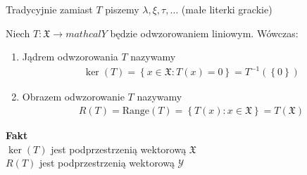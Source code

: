 Tradycyjnie zamiast $ T $ piszemy $ \lambda,\xi,\tau,\dots  $ (małe literki grackie)
\begin{defi}
Niech $ T:\mathfrak X\to mathcal Y $ będzie odwzorowaniem liniowym. Wówczas:
\begin{enumerate}
\item Jądrem odwzorowania $ T $ nazywamy
\begin{gather*}
\ker(T)=\left\{x\in\mathfrak X:T(x)=0\right\}=T^{-1}(\left\{0\right\})
\end{gather*}
\item Obrazem odwzorowanie $ T $ nazywamy
\begin{gather*}
R(T)=\text{Range}(T)=\left\{T(x):x\in\mathfrak X\right\}=T(\mathfrak X)
\end{gather*}
\end{enumerate}
\end{defi}
\textbf{Fakt}\\
$ \ker(T) $ jest podprzestrzenią wektorową $ \mathfrak X $\\
$ R(T) $ jest podprzestrzenią wektorową $ \mathcal Y $